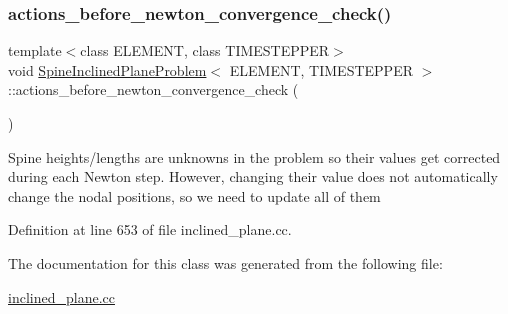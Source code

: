 \subsubsection{\texorpdfstring{actions\+\_\+before\+\_\+newton\+\_\+convergence\+\_\+check()}{actions\_before\_newton\_convergence\_check()}}
{\footnotesize\ttfamily template$<$class E\+L\+E\+M\+E\+NT, class T\+I\+M\+E\+S\+T\+E\+P\+P\+ER$>$ \\
void \hyperlink{classSpineInclinedPlaneProblem}{Spine\+Inclined\+Plane\+Problem}$<$ E\+L\+E\+M\+E\+NT, T\+I\+M\+E\+S\+T\+E\+P\+P\+ER $>$\+::actions\+\_\+before\+\_\+newton\+\_\+convergence\+\_\+check (\begin{DoxyParamCaption}{ }\end{DoxyParamCaption})\hspace{0.3cm}{\ttfamily [inline]}}

Spine heights/lengths are unknowns in the problem so their values get corrected during each Newton step. However, changing their value does not automatically change the nodal positions, so we need to update all of them 

Definition at line 653 of file inclined\+\_\+plane.\+cc.



The documentation for this class was generated from the following file\+:\begin{DoxyCompactItemize}
\item 
\hyperlink{inclined__plane_8cc}{inclined\+\_\+plane.\+cc}\end{DoxyCompactItemize}
